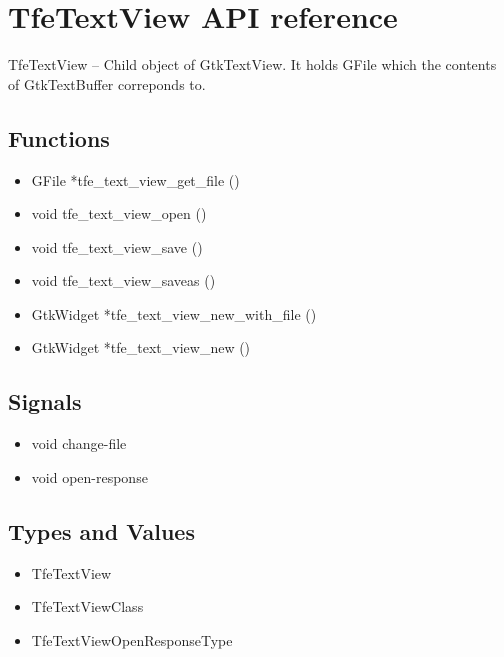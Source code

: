 \hypertarget{tfetextview-api-reference}{%
\section{TfeTextView API reference}\label{tfetextview-api-reference}}

TfeTextView -- Child object of GtkTextView. It holds GFile which the
contents of GtkTextBuffer correponds to.

\hypertarget{functions}{%
\subsection{Functions}\label{functions}}

\begin{itemize}
\tightlist
\item
  GFile *tfe\_text\_view\_get\_file ()
\item
  void tfe\_text\_view\_open ()
\item
  void tfe\_text\_view\_save ()
\item
  void tfe\_text\_view\_saveas ()
\item
  GtkWidget *tfe\_text\_view\_new\_with\_file ()
\item
  GtkWidget *tfe\_text\_view\_new ()
\end{itemize}

\hypertarget{signals}{%
\subsection{Signals}\label{signals}}

\begin{itemize}
\tightlist
\item
  void change-file
\item
  void open-response
\end{itemize}

\hypertarget{types-and-values}{%
\subsection{Types and Values}\label{types-and-values}}

\begin{itemize}
\tightlist
\item
  TfeTextView
\item
  TfeTextViewClass
\item
  TfeTextViewOpenResponseType
\end{itemize}

